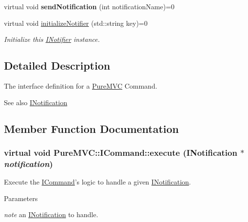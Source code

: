 \begin{DoxyCompactItemize}
\item 
\hypertarget{class_pure_m_v_c_1_1_i_notifier_aca921608a2ced017a8face049fc7c6af}{
virtual void {\bfseries sendNotification} (int notificationName)=0}
\label{class_pure_m_v_c_1_1_i_notifier_aca921608a2ced017a8face049fc7c6af}

\item 
virtual void \hyperlink{class_pure_m_v_c_1_1_i_notifier_a28d7dbbe0726d4d52080546c5d79b232}{initializeNotifier} (std::string key)=0
\begin{DoxyCompactList}\small\item\em Initialize this \hyperlink{class_pure_m_v_c_1_1_i_notifier}{INotifier} instance. \item\end{DoxyCompactList}\end{DoxyCompactItemize}


\subsection{Detailed Description}
The interface definition for a \hyperlink{namespace_pure_m_v_c}{PureMVC} Command. \begin{DoxySeeAlso}{See also}
\hyperlink{class_pure_m_v_c_1_1_i_notification}{INotification} 
\end{DoxySeeAlso}


\subsection{Member Function Documentation}
\hypertarget{class_pure_m_v_c_1_1_i_command_a901132c675301f8e82b1739b54a396b3}{
\subsubsection[{execute}]{\setlength{\rightskip}{0pt plus 5cm}virtual void PureMVC::ICommand::execute ({\bf INotification} $\ast$ {\em notification})}}
\label{class_pure_m_v_c_1_1_i_command_a901132c675301f8e82b1739b54a396b3}


Execute the {\ttfamily \hyperlink{class_pure_m_v_c_1_1_i_command}{ICommand}}'s logic to handle a given {\ttfamily \hyperlink{class_pure_m_v_c_1_1_i_notification}{INotification}}. 
\begin{DoxyParams}{Parameters}
\item[{\em note}]an {\ttfamily \hyperlink{class_pure_m_v_c_1_1_i_notification}{INotification}} to handle. \end{DoxyParams}


